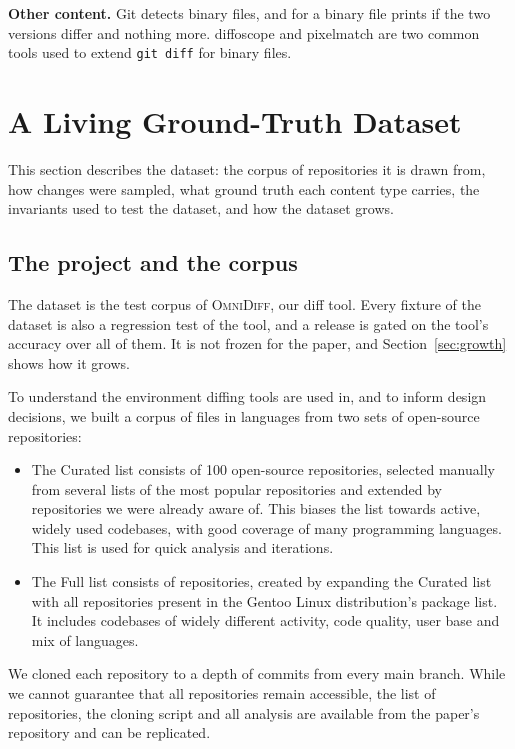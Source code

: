 \documentclass[sigconf,review]{acmart}
\begin{document}
\textbf{Other content.} Git detects binary files, and for a binary file prints if the two
versions differ and nothing more. diffoscope and pixelmatch are two common tools used to extend
\texttt{git diff} for binary files.

\section{A Living Ground-Truth Dataset}
\label{sec:dataset}

This section describes the dataset: the corpus of repositories it is drawn from, how changes were
sampled, what ground truth each content type carries, the invariants used to test the dataset,
and how the dataset grows.

\subsection{The project and the corpus}
\label{sec:project}

The dataset is the test corpus of \textsc{OmniDiff}, our diff tool. Every fixture of the dataset
is also a regression test of the tool, and a release is gated on the tool's accuracy over all of
them. It is not frozen for the paper, and
Section~\ref{sec:growth} shows how it grows.

To understand the environment diffing tools are used in, and to inform design decisions, we built a corpus of \NumFiles{} files
in \NumLanguages{} languages from two sets of open-source repositories:

\begin{itemize}
  \item The Curated list consists of 100 open-source repositories, selected manually from several
    lists of the most popular repositories and extended by repositories we were already aware of.
    This biases the list towards active, widely used codebases, with good coverage of many
    programming languages. This list is used for quick analysis and iterations.
  \item The Full list consists of \NumRepos{} repositories, created by expanding the Curated
    list with all repositories present in the Gentoo Linux distribution's package list. It
    includes codebases of widely different activity, code quality, user base and mix of
    languages.
\end{itemize}

We cloned each repository to a depth of \CorpusCloneDepth{} commits from every main branch. While
we cannot guarantee that all repositories remain accessible, the list of repositories, the cloning
script and all analysis are available from the paper's repository and can be replicated.
\end{document}
